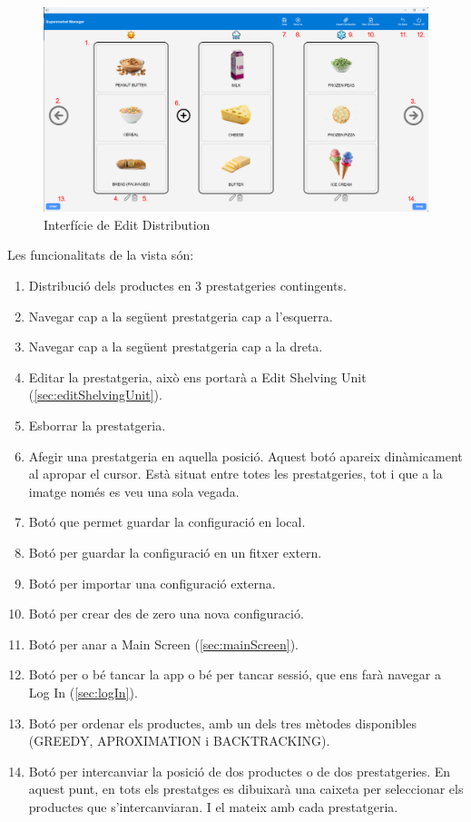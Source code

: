 \documentclass[a4paper,12pt]{article}
\begin{document}
	\begin{figure}[H] 
		\centering
		\includegraphics[width=0.75\linewidth]{assets/editdistribution.png}
		\caption{Interfície de Edit Distribution}
	\end{figure}
	
	\noindent Les funcionalitats de la vista són:
	
	\begin{enumerate}[itemsep=0pt, topsep=0pt]
		\item Distribució dels productes en 3 prestatgeries contingents.
		\item Navegar cap a la següent prestatgeria cap a l'esquerra.
		\item Navegar cap a la següent prestatgeria cap a la dreta.
		\item Editar la prestatgeria, això ens portarà a Edit Shelving Unit (\ref{sec:editShelvingUnit}).
		\item Esborrar la prestatgeria.
		\item Afegir una prestatgeria en aquella posició. Aquest botó apareix dinàmicament al apropar el cursor. Està situat entre totes les prestatgeries, tot i que a la imatge només es veu una sola vegada.
		\item Botó que permet guardar la configuració en local.
		\item Botó per guardar la configuració en un fitxer extern.
		\item Botó per importar una configuració externa.
		\item Botó per crear des de zero una nova configuració.
		\item Botó per anar a Main Screen (\ref{sec:mainScreen}).
		\item Botó per o bé tancar la app o bé per tancar sessió, que ens farà navegar a Log In (\ref{sec:logIn}).
		\item Botó per ordenar els productes, amb un dels tres mètodes disponibles (GREEDY, APROXIMATION i BACKTRACKING).
		\item Botó per intercanviar la posició de dos productes o de dos prestatgeries. En aquest punt, en tots els prestatges es dibuixarà una caixeta per seleccionar els productes que s'intercanviaran. I el mateix amb cada prestatgeria.
	\end{enumerate}
	
\end{document}
